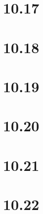 \documentclass[12pt]{article}%
\begin{document}
\section*{10.17}

\section*{10.18}


\section*{10.19}

\section*{10.20}

\section*{10.21}

\section*{10.22}
\end{document}
